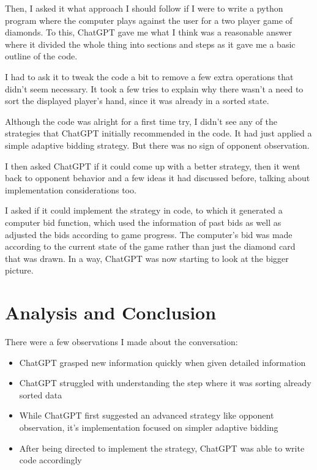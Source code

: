 \documentclass{article}
\begin{document}
Then, I asked it what approach I should follow if I were to write a python program where the computer plays against the user for a two player game of diamonds. To this, ChatGPT gave me what I think was a reasonable answer where it divided the whole thing into sections and steps as it gave me a basic outline of the code. \newline

I had to ask it to tweak the code a bit to remove a few extra operations that didn't seem necessary. It took a few tries to explain why there wasn't a need to sort the displayed player's hand, since it was already in a sorted state. \newline

Although the code was alright for a first time try, I didn't see any of the strategies that ChatGPT initially recommended in the code. It had just applied a simple adaptive bidding strategy. But there was no sign of opponent observation. \newline

I then asked ChatGPT if it could come up with a better strategy, then it went back to opponent behavior and a few ideas it had discussed before, talking about implementation considerations too. \newline

I asked if it could implement the strategy in code, to which it generated a computer bid function, which used the information of past bids as well as adjusted the bids according to game progress. The computer's bid was made according to the current state of the game rather than just the diamond card that was drawn.
In a way, ChatGPT was now starting to look at the bigger picture. \newline

\section{Analysis and Conclusion}
There were a few observations I made about the conversation:

\begin{itemize}
    \item ChatGPT grasped new information quickly when given detailed information
    \item ChatGPT struggled with understanding the step where it was sorting already sorted data
    \item While ChatGPT first suggested an advanced strategy like opponent observation, it's implementation focused on simpler adaptive bidding
    \item After being directed to implement the strategy, ChatGPT was able to write code accordingly
\end{itemize}
\end{document}
